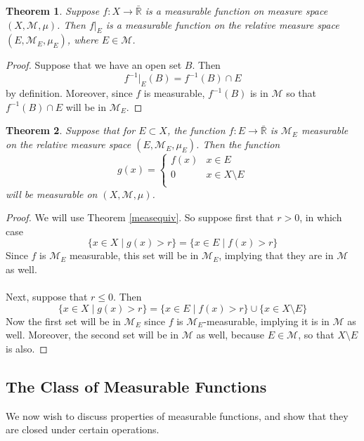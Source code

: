 \documentclass[12pt]{article}
\theoremstyle{plain}
\newtheorem{thm}{Theorem}[subsection]
\theoremstyle{definition}
\theoremstyle{remark}
\begin{document}
\begin{thm}
Suppose $f:X\rightarrow\bar{\mathbb{R}} $ is a measurable function on measure space $(X,\mathscr{M},\mu)$. Then $f|_E$ is a measurable function on the \emph{relative} measure space $(E,\mathscr{M}_E,\mu_E)$, where $E\in\mathscr{M}$.
\end{thm}
\begin{proof}
Suppose that we have an open set $B$. Then 
\[
    f^{-1}|_E(B) = f^{-1}(B)\cap E
\]
by definition. Moreover, since $f$ is measurable, $f^{-1}(B)$ is in $\mathscr{M}$ so that $f^{-1}(B) \cap E$ will be in $\mathscr{M}_E$.
\end{proof}

\begin{thm}
Suppose that for $E\subset X$, the function $f:E\rightarrow\bar{\mathbb{R}}$ is $\mathscr{M}_E$ measurable on the relative measure space $(E,\mathscr{M}_E,\mu_E)$. Then the function
\[
    g(x) = \begin{cases}
            f(x) & x \in E \\
            0 & x \in X\setminus E \\
        \end{cases}
\]
will be measurable on $(X,\mathscr{M},\mu)$.
\end{thm}
\begin{proof}
We will use Theorem \ref{measequiv}. So suppose first that $r>0$, in which case
\[
    \{x \in X \; | \; g(x) > r\} = 
    \{x \in E\; | \; f(x) > r\} 
\]
Since $f$ is $\mathscr{M}_E$ measurable, this set will be in $\mathscr{M}_E$, implying that they are in $\mathscr{M}$ as well.
\\
\\
Next, suppose that $r\leq 0$. Then
\[
    \{x \in X \; | \; g(x) > r\} = 
    \{x \in E\; | \; f(x) > r\} 
    \cup \{x\in X\setminus E \}
\]
Now the first set will be in $\mathscr{M}_E$ since $f$ is $\mathscr{M}_E$-measurable, implying it is in $\mathscr{M}$ as well. Moreover, the second set will be in $\mathscr{M}$ as well, because $E\in\mathscr{M}$, so that $X\setminus E$ is also. 


\end{proof}


\subsection{The Class of Measurable Functions}

We now wish to discuss properties of measurable functions, and show that they are closed under certain operations. 
\end{document}

